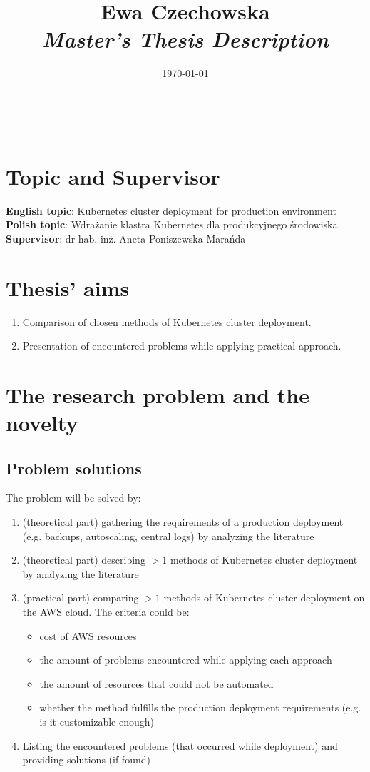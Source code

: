 \documentclass[12pt]{article}
\title{
{\small Ewa Czechowska } \\
\bf\textit{ Master’s Thesis Description } \\
\vspace{4cm}}
\date{\today}
\begin{document}
\maketitle
~\vspace{8cm}
\newpage
\thispagestyle{empty}

\section{Topic and Supervisor}
\textbf{English topic}: Kubernetes cluster deployment for production environment
\\
\textbf{Polish topic}: Wdrażanie klastra Kubernetes dla produkcyjnego środowiska
\\
\textbf{Supervisor}: dr hab. inż. Aneta Poniszewska-Marańda

\section{Thesis' aims}
\begin{enumerate}
    \item Comparison of chosen methods of Kubernetes cluster deployment. 
    \item Presentation of encountered problems while applying practical approach.
\end{enumerate}


\section{The research problem and the novelty}
\subsection{Problem solutions}
The problem will be solved by:
\begin{enumerate}
    \item (theoretical part) gathering the requirements of a production deployment (e.g. backups, autoscaling, central logs) by analyzing the literature
    \item (theoretical part) describing $>1$ methods of Kubernetes cluster deployment by analyzing the literature
    \item (practical part) comparing $>1$ methods of Kubernetes cluster deployment on the AWS cloud. The criteria could be:
    \begin{itemize}
        \item cost of AWS resources
        \item the amount of problems encountered while applying each approach
        \item the amount of resources that could not be automated
        \item whether the method fulfills the production deployment requirements (e.g. is it customizable enough)
    \end{itemize}
    \item Listing the encountered problems (that occurred while deployment) and providing solutions (if found)
\end{enumerate}
\end{document}
